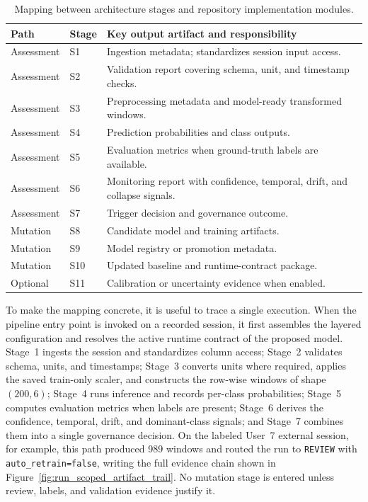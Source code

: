 \renewcommand{\arraystretch}{1.15}
\begin{table}[htbp]
\centering
\footnotesize
\caption[Mapping between architecture stages and repository implementation...]{Mapping between architecture stages and repository implementation modules.}
\label{tab:stage_module_map}
\begin{tabularx}{\textwidth}{p{2.4cm} p{1.1cm} X}
\toprule
\textbf{Path} & \textbf{Stage} & \textbf{Key output artifact and responsibility} \\
\midrule
Assessment & S1 & Ingestion metadata; standardizes session input access. \\
Assessment & S2 & Validation report covering schema, unit, and timestamp checks. \\
Assessment & S3 & Preprocessing metadata and model-ready transformed windows. \\
Assessment & S4 & Prediction probabilities and class outputs. \\
Assessment & S5 & Evaluation metrics when ground-truth labels are available. \\
Assessment & S6 & Monitoring report with confidence, temporal, drift, and collapse signals. \\
Assessment & S7 & Trigger decision and governance outcome. \\
Mutation & S8 & Candidate model and training artifacts. \\
Mutation & S9 & Model registry or promotion metadata. \\
Mutation & S10 & Updated baseline and runtime-contract package. \\
Optional & S11 & Calibration or uncertainty evidence when enabled. \\
\bottomrule
\end{tabularx}
\renewcommand{\arraystretch}{1.0}
\end{table}

To make the mapping concrete, it is useful to trace a single execution. When the pipeline entry point is invoked on a recorded session, it first assembles the layered configuration and resolves the active runtime contract of the proposed model. Stage~1 ingests the session and standardizes column access; Stage~2 validates schema, units, and timestamps; Stage~3 converts units where required, applies the saved train-only scaler, and constructs the row-wise windows of shape $(200,6)$; Stage~4 runs inference and records per-class probabilities; Stage~5 computes evaluation metrics when labels are present; Stage~6 derives the confidence, temporal, drift, and dominant-class signals; and Stage~7 combines them into a single governance decision. On the labeled User~7 external session, for example, this path produced 989 windows and routed the run to \texttt{REVIEW} with \texttt{auto\_retrain=false}, writing the full evidence chain shown in Figure~\ref{fig:run_scoped_artifact_trail}. No mutation stage is entered unless review, labels, and validation evidence justify it.

